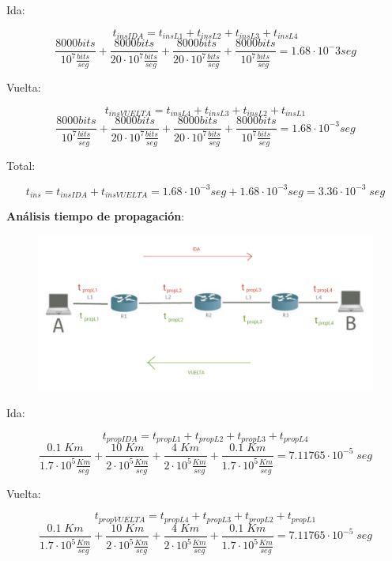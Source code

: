 \documentclass[titlepage,a4paper]{article}
\begin{document}
Ida:

$$ t_{insIDA} = t_{insL1} + t_{insL2} + t_{insL3} +t_{insL4} $$ 
$$\frac{8000 bits}{10^7 \frac{bits}{seg}}  + \frac{8000 bits}{20\cdot 10^7 \frac{bits}{seg}}  + \frac{8000 bits}{20\cdot 10^7 \frac{bits}{seg}} + \frac{8000 bits}{10^7 \frac{bits}{seg}} = 1.68 \cdot 10^-3 seg$$

Vuelta:

$$ t_{insVUELTA} = t_{insL4} + t_{insL3} + t_{insL2} +t_{insL1} $$ 
$$  \frac{8000 bits}{10^7 \frac{bits}{seg}}  + \frac{8000 bits}{20\cdot 10^7 \frac{bits}{seg}}  + \frac{8000 bits}{20\cdot 10^7 \frac{bits}{seg}} + \frac{8000 bits}{10^7 \frac{bits}{seg}} = 1.68 \cdot 10^{-3} seg $$

Total:

$$ t_{ins} = t_{insIDA} + t_{insVUELTA} =   1.68 \cdot 10^{-3} seg +  1.68 \cdot 10^{-3} seg =  3.36 \cdot 10^{-3} \; seg$$


\textbf{Análisis tiempo de propagación}: \\

\begin{figure}[H]
\centering
\includegraphics[width=\textwidth]{tiempoPropagacion.png}
\end{figure}

Ida:

$$t_{propIDA} = t_{propL1} + t_{propL2}  + t_{propL3} + t_{propL4} $$ 
$$ \frac{0.1 \; Km}{1.7\cdot10^5\frac{Km}{seg}} + \frac{10 \; Km}{2\cdot10^5\frac{Km}{seg}} + \frac{4 \; Km}{2\cdot10^5\frac{Km}{seg}} + \frac{0.1 \; Km}{1.7\cdot10^5\frac{Km}{seg}} = 7.11765 \cdot 10^{-5} \; seg $$

Vuelta:

$$t_{propVUELTA} = t_{propL4} + t_{propL3} + t_{propL2} + t_{propL1} $$ 
$$ \frac{0.1 \; Km}{1.7\cdot10^5\frac{Km}{seg}} + \frac{10 \; Km}{2\cdot10^5\frac{Km}{seg}} + \frac{4 \; Km}{2\cdot10^5\frac{Km}{seg}} + \frac{0.1 \; Km}{1.7\cdot10^5\frac{Km}{seg}} = 7.11765 \cdot 10^{-5} \; seg  $$
\end{document}
